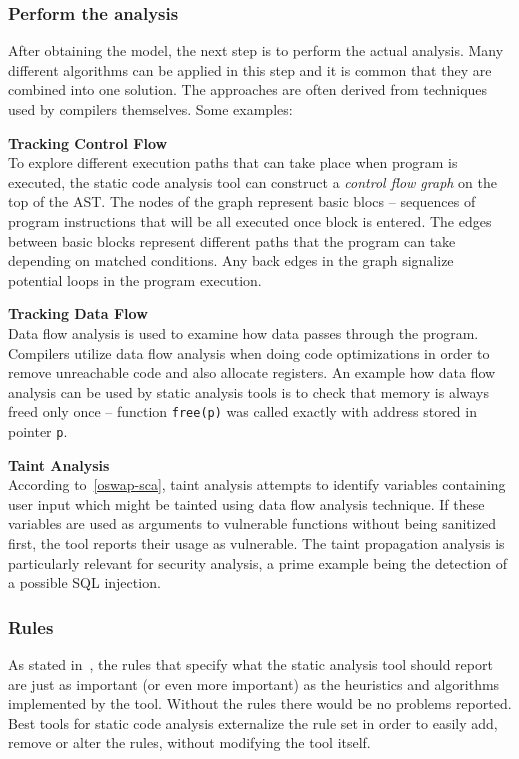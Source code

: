 \documentclass[
  digital, %
  table,   %
  lof,     %
  lot,     %
  oneside,
]{fithesis3}
\begin{document}
\subsubsection{Perform the analysis}
After obtaining the model, the next step is to perform the actual analysis. Many different algorithms can be applied in this step and it is common that they are combined into one solution. The approaches are often derived from techniques used by compilers themselves. Some examples:

\noindent
\textbf{Tracking Control Flow} \\
\noindent
To explore different execution paths that can take place when program is executed, the static code analysis tool can construct a \textit{control flow graph} on the top of the AST. The nodes of the graph represent basic blocs -- sequences of program instructions that will be all executed once block is entered. The edges between basic blocks represent different paths that the program can take depending on matched conditions. Any back edges in the graph signalize potential loops in the program execution.

\noindent
\textbf{Tracking Data Flow} \\
\noindent
Data flow analysis is used to examine how data passes through the program. Compilers utilize data flow analysis when doing code optimizations in order to remove unreachable code and also allocate registers. An example how data flow analysis can be used by static analysis tools is to check that memory is always freed only once -- function \texttt{free(p)} was called exactly with address stored in pointer \texttt{p}.

\noindent
\textbf{Taint Analysis} \\
\noindent
According to~\ref{oswap-sca}, taint analysis attempts to identify variables containing user input which might be tainted using data flow analysis technique. If these variables are used as arguments to vulnerable functions without being sanitized first, the tool reports their usage as vulnerable. The taint propagation analysis is particularly relevant for security analysis, a prime example being the detection of a possible SQL injection.

\subsubsection{Rules}
As stated in~\cite{secure-programming}, the rules that specify what the static analysis tool should report are just as important (or even more important) as the heuristics and algorithms implemented by the tool. Without the rules there would be no problems reported. Best tools for static code analysis externalize the rule set in order to easily add, remove or alter the rules, without modifying the tool itself.
\end{document}
